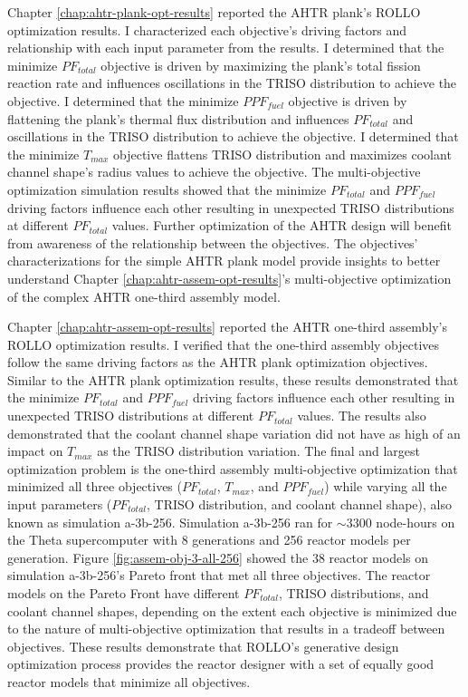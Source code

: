 Chapter \ref{chap:ahtr-plank-opt-results} reported the \gls{AHTR} plank's 
\gls{ROLLO} optimization results.
I characterized each objective's driving factors and relationship 
with each input parameter from the results. 
I determined that the minimize $PF_{total}$ objective is driven by maximizing the plank's 
total fission reaction rate and influences oscillations in the TRISO distribution to 
achieve the objective. 
I determined that the minimize $PPF_{fuel}$ objective is driven by flattening the plank's
thermal flux distribution and influences $PF_{total}$ and oscillations in the TRISO 
distribution to achieve the objective.
I determined that the minimize $T_{max}$ objective flattens TRISO distribution and 
maximizes coolant channel shape's radius values to achieve the objective.
The multi-objective optimization simulation results showed that 
the minimize $PF_{total}$ and $PPF_{fuel}$ driving factors influence each other 
resulting in unexpected TRISO distributions at different $PF_{total}$ values. 
Further optimization of the \gls{AHTR} design will benefit from awareness 
of the relationship between the objectives. 
The objectives' characterizations for the simple \gls{AHTR} plank model provide insights 
to better understand Chapter \ref{chap:ahtr-assem-opt-results}'s multi-objective 
optimization of the complex \gls{AHTR} one-third assembly model.   

Chapter \ref{chap:ahtr-assem-opt-results} reported the \gls{AHTR} one-third assembly's
\gls{ROLLO} optimization results.
I verified that the one-third assembly objectives follow the same driving 
factors as the \gls{AHTR} plank optimization objectives. 
Similar to the \gls{AHTR} plank optimization results, these results demonstrated that 
the minimize $PF_{total}$ and $PPF_{fuel}$ driving factors influence each other 
resulting in unexpected TRISO distributions at different $PF_{total}$ values. 
The results also demonstrated that the coolant channel shape variation did 
not have as high of an impact on $T_{max}$ as the \gls{TRISO} distribution variation.
The final and largest optimization problem is the one-third assembly multi-objective 
optimization that minimized all three objectives ($PF_{total}$, $T_{max}$, and 
$PPF_{fuel}$) while varying all the input parameters ($PF_{total}$, TRISO distribution, 
and coolant channel shape), also known as simulation a-3b-256. 
Simulation a-3b-256 ran for $\sim 3300$ node-hours on the Theta supercomputer 
with 8 generations and 256 reactor models per generation. 
Figure \ref{fig:assem-obj-3-all-256} showed the 38 reactor models on simulation 
a-3b-256's Pareto front that met all three objectives. 
The reactor models on the Pareto Front have different $PF_{total}$, TRISO distributions, 
and coolant channel shapes, depending on the extent each objective is minimized due 
to the nature of multi-objective optimization that results in a tradeoff between 
objectives. 
These results demonstrate that \gls{ROLLO}'s generative design optimization process 
provides the reactor designer with a set of equally good reactor models that minimize 
all objectives.

